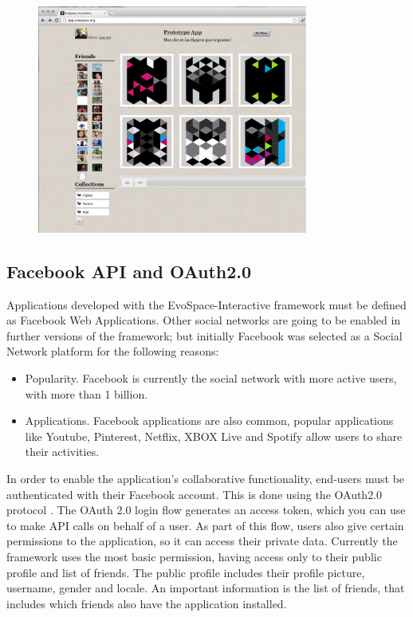 \documentclass{sig-alternate}
\begin{document}
\begin{figure}[!t]
    \centering
        \includegraphics[width=3.5in]{EvoApp.eps}
    \caption{}
    \label{fig:web}
\end{figure}

\subsection{Facebook API and OAuth2.0}
Applications developed with the EvoSpace-Interactive framework must be defined as Facebook Web Applications. Other social networks are going to be enabled in further versions of the framework; but initially Facebook was selected as a Social Network platform for the following reasons:
\begin{itemize}
	\item Popularity. Facebook is currently the social network with more active users, with more than 1 billion. 

	\item Applications. Facebook applications are also common, popular applications like Youtube, Pinterest, Netflix, XBOX Live and Spotify allow users to share their activities.	
\end{itemize}
In order to enable the application's collaborative functionality, end-users must be authenticated with their Facebook account. This is done using the OAuth2.0 protocol \cite{hammer2011oauth}. The OAuth 2.0 login flow generates an access token, which you can use to make API calls on behalf of a user. As part of this flow, users also give certain permissions to the application, so it can access their private data. Currently the framework uses the most basic permission, having access only to their public profile and list of friends. The public profile includes their profile picture, username, gender and locale. An important information is the list of friends, that includes which friends also have the application installed. 
\end{document}
